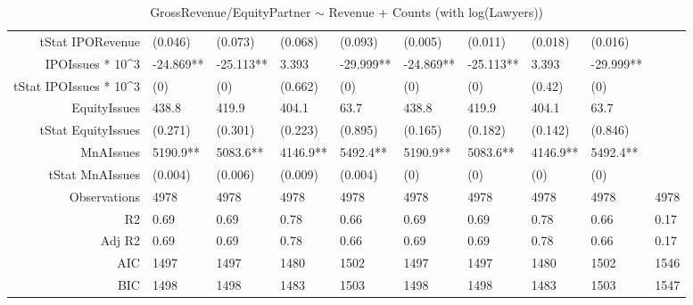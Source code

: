 \begin{table}[ht]
\begin{tabular}{rlllllllll}
  tStat IPORevenue & (0.046) & (0.073) & (0.068) & (0.093) & (0.005) & (0.011) & (0.018) & (0.016) &  \\ 
  IPOIssues * 10^3 & -24.869** & -25.113** & 3.393 & -29.999** & -24.869** & -25.113** & 3.393 & -29.999** &  \\ 
  tStat IPOIssues * 10^3 & (0) & (0) & (0.662) & (0) & (0) & (0) & (0.42) & (0) &  \\ 
  EquityIssues & 438.8 & 419.9 & 404.1 & 63.7 & 438.8 & 419.9 & 404.1 & 63.7 &  \\ 
  tStat EquityIssues & (0.271) & (0.301) & (0.223) & (0.895) & (0.165) & (0.182) & (0.142) & (0.846) &  \\ 
  MnAIssues & 5190.9** & 5083.6** & 4146.9** & 5492.4** & 5190.9** & 5083.6** & 4146.9** & 5492.4** &  \\ 
  tStat MnAIssues & (0.004) & (0.006) & (0.009) & (0.004) & (0) & (0) & (0) & (0) &  \\ 
  Observations & 4978 & 4978 & 4978 & 4978 & 4978 & 4978 & 4978 & 4978 & 4978 \\ 
  R2 & 0.69 & 0.69 & 0.78 & 0.66 & 0.69 & 0.69 & 0.78 & 0.66 & 0.17 \\ 
  Adj R2 & 0.69 & 0.69 & 0.78 & 0.66 & 0.69 & 0.69 & 0.78 & 0.66 & 0.17 \\ 
  AIC & 1497 & 1497 & 1480 & 1502 & 1497 & 1497 & 1480 & 1502 & 1546 \\ 
  BIC & 1498 & 1498 & 1483 & 1503 & 1498 & 1498 & 1483 & 1503 & 1547 \\ 
   \hline
\end{tabular}
\caption{GrossRevenue/EquityPartner $\sim$ Revenue + Counts (with log(Lawyers))} 
\end{table}
